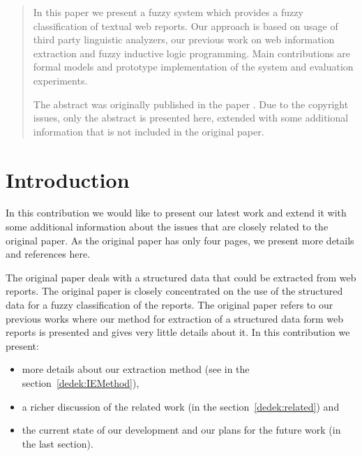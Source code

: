 
\MakeContributionTitle

\begin{multicols}{2}

\begin{abstract}
In this paper we present a fuzzy system which provides a fuzzy classification of textual web reports. Our approach is based on usage of third party linguistic analyzers, our previous work on web information extraction and fuzzy inductive logic programming. Main contributions are formal models and prototype implementation of the system and evaluation experiments. 

\medskip

The abstract was originally published in the paper \cite{Dedek:FuzzWI}. Due to the copyright issues, only the abstract is presented here, extended with some additional information that is not included in the original paper.
\end{abstract}


\section{Introduction}
In this contribution we would like to present our latest work \cite{Dedek:FuzzWI} and extend it with some additional information about the issues that are closely related to the original paper. As the original paper has only four pages, we present more details and references here.

The original paper deals with a structured data that could be extracted from web reports. The original paper is closely concentrated on the use of the structured data for a fuzzy classification of the reports. The original paper refers to our previous works where our method for extraction of a structured data form web reports is presented and gives very little details about it. In this contribution we present:
\begin{itemize}
	\item more details about our extraction method (see in the section~\ref{dedek:IEMethod}),
	\item a richer discussion of the related work (in the section~\ref{dedek:related}) and
	\item the current state of our development and our plans for the future work (in the last section).
\end{itemize}


\end{multicols}
